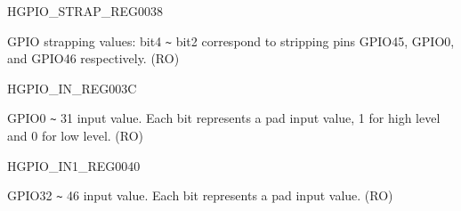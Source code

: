 \begin{register}{H}{GPIO\_STRAP\_REG}{\hexprefix{}0038}\label{regdesc:GPIOSTRAPREG}
%
%
\regnewline%
\begin{regdesc}\begin{reglist}
\label{fielddesc:GPIOSTRAPPING}\item [GPIO\_STRAPPING] GPIO strapping values: bit4 \verb+~+ bit2 correspond to stripping pins GPIO45, GPIO0, and GPIO46 respectively. (RO)
\end{reglist}\end{regdesc}
\end{register}


\begin{register}{H}{GPIO\_IN\_REG}{\hexprefix{}003C}\label{regdesc:GPIOINREG}
%
\regnewline%
\begin{regdesc}\begin{reglist}
\label{fielddesc:GPIOINDATANEXT}\item [GPIO\_IN\_DATA\_NEXT] GPIO0 \verb+~+ 31 input value. Each bit represents a pad input value, 1 for high level and 0 for low level. (RO)
\end{reglist}\end{regdesc}
\end{register}


\begin{register}{H}{GPIO\_IN1\_REG}{\hexprefix{}0040}\label{regdesc:GPIOIN1REG}
%
%
\regnewline%
\begin{regdesc}\begin{reglist}
\label{fielddesc:GPIOINDATA1NEXT}\item [GPIO\_IN\_DATA1\_NEXT] GPIO32 \verb+~+ 46 input value. Each bit represents a pad input value. (RO)
\end{reglist}\end{regdesc}
\end{register}


